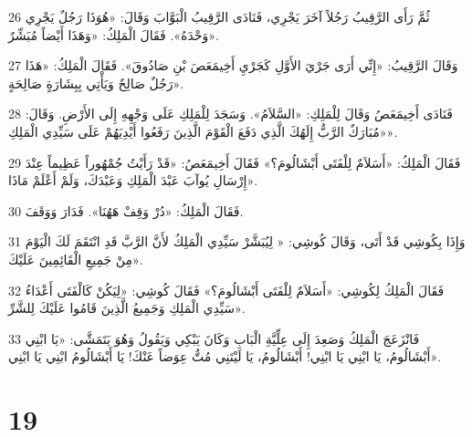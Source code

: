 \par 26 ثُمَّ رَأَى الرَّقِيبُ رَجُلاً آخَرَ يَجْرِي، فَنَادَى الرَّقِيبُ الْبَوَّابَ وَقَالَ: «هُوَذَا رَجُلٌ يَجْرِي وَحْدَهُ». فَقَالَ الْمَلِكُ: «وَهَذَا أَيْضاً مُبَشِّرٌ».
\par 27 وَقَالَ الرَّقِيبُ: «إِنِّي أَرَى جَرْيَ الأَوَّلِ كَجَرْيِ أَخِيمَعَصَ بْنِ صَادُوقَ». فَقَالَ الْمَلِكُ: «هَذَا رَجُلٌ صَالِحٌ وَيَأْتِي بِبِشَارَةٍ صَالِحَةٍ».
\par 28 فَنَادَى أَخِيمَعَصُ وَقَالَ لِلْمَلِكِ: «السَّلاَمُ». وَسَجَدَ لِلْمَلِكِ عَلَى وَجْهِهِ إِلَى الأَرْضِ. وَقَالَ: «مُبَارَكٌ الرَّبُّ إِلَهُكَ الَّذِي دَفَعَ الْقَوْمَ الَّذِينَ رَفَعُوا أَيْدِيَهُمْ عَلَى سَيِّدِي الْمَلِكِ».
\par 29 فَقَالَ الْمَلِكُ: «أَسَلاَمٌ لِلْفَتَى أَبْشَالُومَ؟» فَقَالَ أَخِيمَعَصُ: «قَدْ رَأَيْتُ جُمْهُوراً عَظِيماً عِنْدَ إِرْسَالِ يُوآبَ عَبْدَ الْمَلِكِ وَعَبْدَكَ، وَلَمْ أَعْلَمْ مَاذَا».
\par 30 فَقَالَ الْمَلِكُ: «دُرْ وَقِفْ هَهُنَا». فَدَارَ وَوَقَفَ.
\par 31 وَإِذَا بِكُوشِي قَدْ أَتَى، وَقَالَ كُوشِي: « لِيُبَشَّرْ سَيِّدِي الْمَلِكُ لأَنَّ الرَّبَّ قَدِ انْتَقَمَ لَكَ الْيَوْمَ مِنْ جَمِيعِ الْقَائِمِينَ عَلَيْكَ».
\par 32 فَقَالَ الْمَلِكُ لِكُوشِي: «أَسَلاَمٌ لِلْفَتَى أَبْشَالُومَ؟» فَقَالَ كُوشِي: «لِيَكُنْ كَالْفَتَى أَعْدَاءُ سَيِّدِي الْمَلِكِ وَجَمِيعُ الَّذِينَ قَامُوا عَلَيْكَ لِلشَّرِّ».
\par 33 فَانْزَعَجَ الْمَلِكُ وَصَعِدَ إِلَى عِلِّيَّةِ الْبَابِ وَكَانَ يَبْكِي وَيَقُولُ وَهُوَ يَتَمَشَّى: «يَا ابْنِي أَبْشَالُومُ، يَا ابْنِي يَا ابْنِي! أَبْشَالُومُ، يَا لَيْتَنِي مُتُّ عِوَضاً عَنْكَ! يَا أَبْشَالُومُ ابْنِي يَا ابْنِي».

\chapter{19}

